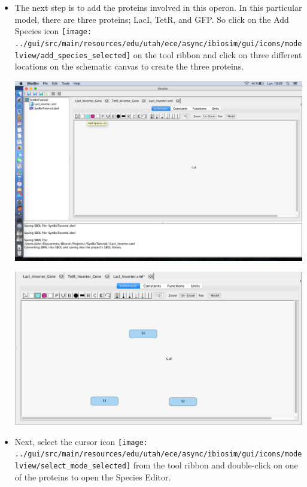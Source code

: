 \documentclass[titlepage,11pt]{article}
\begin{document}
\begin{itemize}
\item The next step is to add the proteins involved in this operon. In this particular model, there are three proteins; LacI, TetR, and GFP. So click on the Add Species icon \texttt{[image: ../gui/src/main/resources/edu/utah/ece/async/ibiosim/gui/icons/modelview/add\_species\_selected]} on the tool ribbon and click on three different locations on the schematic canvas to create the three proteins.

\begin{center}
\includegraphics[width=160mm]{screenshots/schematicGT}
\end{center}

\begin{center}
\includegraphics[width=160mm]{"screenshots/Proteins Inserted"}
\end{center}

\item Next, select the cursor icon \texttt{[image: ../gui/src/main/resources/edu/utah/ece/async/ibiosim/gui/icons/modelview/select\_mode\_selected]} from the tool ribbon and double-click on one of the proteins to open the Species Editor.


\end{itemize}
\end{document}
